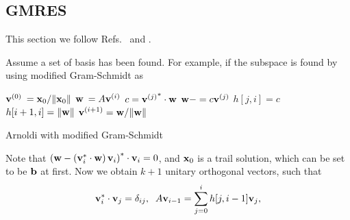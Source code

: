 \subsection{\label{sec:GMRES}GMRES}

This section we follow Refs.~\cite{templates} and \cite{sparselinearbook1}.

Assume a set of basis has been found. For example, if the subspace is found by using modified Gram-Schmidt as
\begin{algorithm}[H]
\begin{algorithmic}
\State ${\bf v}^{(0)}\:={\bf x}_0/\|{\bf x}_0\|$
    \State ${\bf w}\:=A{\bf v}^{(i)}$
        \State $c={{\bf v}^{(j)}}^*\cdot {\bf w}$
        \State ${\bf w}-=c{\bf v}^{(j)}$
        \State $h[j,i]=c$
    \EndFor
    \State $h[i+1,i]=\|{\bf w}\|$
    \State ${\bf v}^{(i+1)}={\bf w}/\|{\bf w}\|$
\EndFor
\end{algorithmic}
\caption{\label{alg.ArnoldiModifiedGS}Arnoldi with modified Gram-Schmidt}
\end{algorithm}

Note that $\left({\bf w}-\left({\bf v}_i^*\cdot {\bf w}\right){\bf v}_i\right)^* \cdot {\bf v}_i=0$, and ${\bf x}_0$ is a trail solution, which can be set to be ${\bf b}$ at first. Now we obtain $k+1$ unitary orthogonal vectors, such that
\begin{equation}
\begin{split}
&{\bf v}_i^*\cdot {\bf v}_j=\delta _{ij},\;\;A{\bf v}_{i-1}=\sum _{j=0}^i h[j,i-1]{\bf v}_j,\\
\end{split}
\end{equation}

